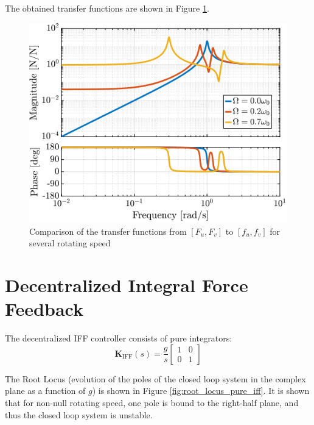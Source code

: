 \documentclass[a4paper, 10pt, DIV=12, parskip=full]{scrreprt}
\begin{document}
The obtained transfer functions are shown in Figure \ref{fig:plant_iff_compare_rotating_speed}.
\begin{figure}[htbp]
\centering
\includegraphics[scale=1]{figs/plant_iff_compare_rotating_speed.png}
\caption{\label{fig:plant_iff_compare_rotating_speed}Comparison of the transfer functions from \([F_u, F_v]\) to \([f_u, f_v]\) for several rotating speed}
\end{figure}

\section{Decentralized Integral Force Feedback}
\label{sec:org2d5427a}
The decentralized IFF controller consists of pure integrators:
\begin{equation}
  \bm{K}_{\text{IFF}}(s) = \frac{g}{s} \begin{bmatrix}
    1 & 0 \\
    0 & 1
  \end{bmatrix}
\end{equation}

The Root Locus (evolution of the poles of the closed loop system in the complex plane as a function of \(g\)) is shown in Figure \ref{fig:root_locus_pure_iff}.
It is shown that for non-null rotating speed, one pole is bound to the right-half plane, and thus the closed loop system is unstable.
\end{document}
